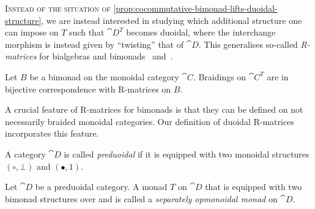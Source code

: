 \textsc{Instead of the situation of}
\cref{prop:cocommutative-bimonad-lifts-duoidal-structure},
we are instead interested in studying which additional structure one can impose on \(T\)
such that \(\cat{D}^T\) becomes duoidal,
where the interchange morphism is instead given by ``twisting'' that of \(\cat{D}\).
This generalises so-called \emph{R\hyp{}matrices}
for bialgebras and bimonads~\cite[Part~\textsc{ii}]{Kassel1998}
and~\cite[Section~8.2]{Bruguieres2007}.

\begin{proposition}\label{prop:R-matrix-monoidal-case}
  Let \(B\) be a bimonad on the monoidal category \(\cat{C}\).
  Braidings on \(\cat{C}^T\) are in bijective correspondence with R\hyp{}matrices on \(B\).
\end{proposition}

A crucial feature of R\hyp{}matrices for bimonads
is that they can be defined on not necessarily braided monoidal categories.
Our definition of duoidal R\hyp{}matrices incorporates this feature.

\begin{definition}\label{def:preduoidal}
  A category \(\cat{D}\) is called \emph{preduoidal} if it is
  equipped with two monoidal structures \((\circ, \bot)\) and \((\bullet, 1)\).
\end{definition}

\begin{definition}\label{def:2-opmonoidal-monad}
  Let \(\cat{D}\) be a preduoidal category.
  A monad \(T\) on \(\cat{D}\)
  that is equipped with two bimonad structures over \duoidalw{} and \duoidalb{}
  is called a \emph{separately opmonoidal monad} on \(\cat{D}\).
\end{definition}

